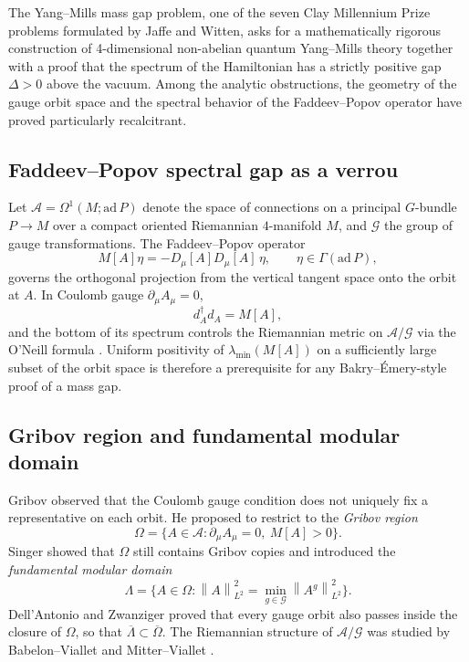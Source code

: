 \documentclass[11pt,a4paper]{amsart}
\theoremstyle{definition}
\newcommand{\norm}[1]{\left\lVert#1\right\rVert}
\begin{document}
The Yang--Mills mass gap problem, one of the seven Clay Millennium Prize problems formulated by Jaffe and Witten, asks for a mathematically rigorous construction of 4-dimensional non-abelian quantum Yang--Mills theory together with a proof that the spectrum of the Hamiltonian has a strictly positive gap $\Delta > 0$ above the vacuum. Among the analytic obstructions, the geometry of the gauge orbit space and the spectral behavior of the Faddeev--Popov operator have proved particularly recalcitrant.

\subsection{Faddeev--Popov spectral gap as a verrou}
Let $\mathcal A = \Omega^1(M; \mathrm{ad}\,P)$ denote the space of connections on a principal $G$-bundle $P \to M$ over a compact oriented Riemannian $4$-manifold $M$, and $\mathcal G$ the group of gauge transformations. The Faddeev--Popov operator
\[
  M[A]\eta = -D_\mu[A] D_\mu[A]\,\eta, \qquad \eta \in \Gamma(\mathrm{ad}\,P),
\]
governs the orthogonal projection from the vertical tangent space onto the orbit at $A$. In Coulomb gauge $\partial_\mu A_\mu = 0$,
\[
  d_A^\dagger d_A = M[A],
\]
and the bottom of its spectrum controls the Riemannian metric on $\mathcal A/\mathcal G$ via the O'Neill formula \cite{BabelonViallet1981}. Uniform positivity of $\lambda_{\min}(M[A])$ on a sufficiently large subset of the orbit space is therefore a prerequisite for any Bakry--\'Emery-style proof of a mass gap.

\subsection{Gribov region and fundamental modular domain}
Gribov \cite{Gribov1978} observed that the Coulomb gauge condition does not uniquely fix a representative on each orbit. He proposed to restrict to the \emph{Gribov region}
\[
  \Omega = \bigl\{A \in \mathcal A : \partial_\mu A_\mu = 0, \ M[A] > 0\bigr\}.
\]
Singer \cite{Singer1978} showed that $\Omega$ still contains Gribov copies and introduced the \emph{fundamental modular domain}
\[
  \Lambda = \bigl\{A \in \Omega : \norm{A}_{L^2}^{2} = \min_{g \in \mathcal G} \norm{A^g}_{L^2}^{2}\bigr\}.
\]
Dell'Antonio and Zwanziger \cite{DellAntonioZwanziger1991} proved that every gauge orbit also passes inside the closure of $\Omega$, so that $\overline{\Lambda} \subset \overline{\Omega}$. The Riemannian structure of $\mathcal A/\mathcal G$ was studied by Babelon--Viallet \cite{BabelonViallet1981} and Mitter--Viallet \cite{MitterViallet1981}.
\end{document}
